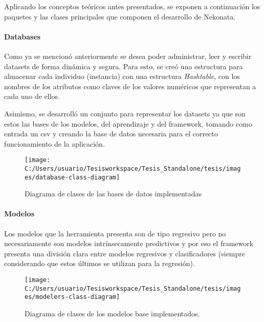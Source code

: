 Aplicando los conceptos teóricos antes presentados, se exponen a continuación
los paquetes y las clases principales que componen el desarrollo de
Nekonata. 


\paragraph*{Databases}

Como ya se mencionó anteriormente se desea poder administrar, leer
y escribir datasets de forma dinámica y segura. Para esto, se creó
una estructura para almacenar cada individuo (instancia) con una estructura
\emph{Hashtable}, con los nombres de los atributos como claves de
los valores numéricos que representan a cada uno de ellos.

Asimismo, se desarrolló un conjunto para representar los datasets
ya que son estos las bases de los modelos, del aprendizaje y del framework,
tomando como entrada un csv y creando la base de datos necesaria para
el correcto funcionamiento de la aplicación. 

\begin{figure}
\begin{centering}
\texttt{[image: C:/Users/usuario/Tesisworkspace/Tesis\_Standalone/tesis/images/database-class-diagram]}
\par\end{centering}

\caption{Diagrama de clases de las bases de datos implementadas\label{fig:database-class-diagram}}
\end{figure}



\paragraph*{Modelos}

Los modelos que la herramienta presenta son de tipo regresivo pero
no necesariamente son modelos intrínsecamente predictivos y por eso
el framework presenta una división clara entre modelos regresivos
y clasificadores (siempre considerando que estos últimos se utilizan
para la regresión).

\begin{figure}
\begin{centering}
\texttt{[image: C:/Users/usuario/Tesisworkspace/Tesis\_Standalone/tesis/images/modelers-class-diagram]}
\par\end{centering}

\caption{Diagrama de clases de los modelos base implementados.\label{fig:modelers-class-diagram}}
\end{figure}


